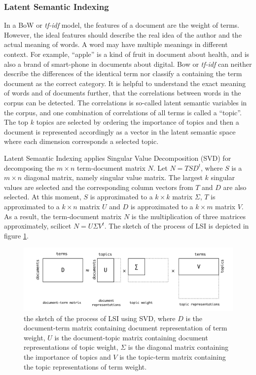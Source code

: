 \subsubsection{Latent Semantic Indexing}

In a BoW or \textit{tf-idf}  model, the features of a document are the weight of terms. However, the ideal features should describe the real idea of the author and the actual meaning of words. A word may have multiple meanings in different context. For example, ``apple'' is a kind of fruit in document about health, and is also a brand of smart-phone in documents about digital. Bow or \textit{tf-idf} can neither describe the differences of the identical term nor classify a containing the term document as the correct category. It is helpful to understand the exact meaning of words and of documents further, that the correlations between words in the corpus can be detected. The correlations is so-called latent semantic variables in the corpus, and one combination of correlations of all terms is called a ``topic''. The top $k$ topics are selected by ordering the importance of topics and then a document is represented accordingly as a vector in the latent semantic space where each dimension corresponds a selected topic. 

Latent Semantic Indexing applies Singular Value Decomposition (SVD) for decomposing the  $m\times n$ term-document matrix $N$. Let $N=TSD^t$, where $S$ is a $m\times n$ diagonal matrix, namely singular value matrix. The largest $k$ singular values are selected and the corresponding column vectors from $T$ and $D$ are also selected. At this moment, $S$ is approximated to a $k\times k$ matrix $\Sigma$, $T$ is approximated to a $k\times n$ matrix $U$ and $D$ is approximated to a $k\times m$ matrix $V$. As a result, the term-document matrix $N$ is the multiplication of three matrices approximately, scilicet $N=U\Sigma V^t$. The sketch of the process of LSI is depicted in figure \ref{fig:svd}.

\begin{figure}[!htb]
    \centering
    \includegraphics[width=1\textwidth]{fig/SVD.pdf}
    \caption[The sketch of the process of LSI using SVD]{the sketch of the process of LSI using SVD, where $D$ is the document-term matrix containing document representation of term weight, $U$ is the document-topic matrix containing document representations of topic weight, $\Sigma$ is the diagonal matrix containing the importance of topics and $V$ is the topic-term matrix containing the topic representations of term weight.}
    \label{fig:svd}
\end{figure}

